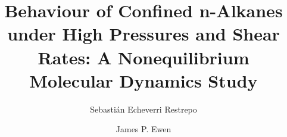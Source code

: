 \documentclass[5p]{elsarticle}
\begin{document}

\title{Behaviour of Confined n-Alkanes under High Pressures and Shear Rates: A Nonequilibrium Molecular Dynamics Study}


\author[SKF,KCL]{Sebasti\'{a}n Echeverri Restrepo}
\author[IC]{James P. Ewen}
\address[SKF]{SKF Research \& Technology Development (RTD), SKF B.V., Nieuwegein, The Netherlands}
\address[KCL]{Department of Physics, King's College London, Strand, London WC2R 2LS, UK}
\address[IC]{Department of Mechanical Engineering, Imperial College London, London SW7 2AZ, England, UK}

\end{document}

